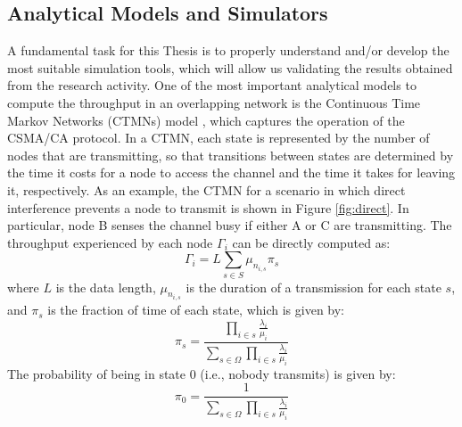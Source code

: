 \documentclass[12pt, a4paper,twoside]{tesi_upf}
\begin{document}
			\subsection{Analytical Models and Simulators}
			\label{section:validation}	
				A fundamental task for this Thesis is to properly understand and/or develop the most suitable simulation tools, which will allow us validating the results obtained from the research activity. One of the most important analytical models to compute the throughput in an overlapping network is the Continuous Time Markov Networks (CTMNs) model \cite{bellalta2014throughput}, which captures the operation of the CSMA/CA protocol. In a CTMN, each state is represented by the number of nodes that are transmitting, so that transitions between states are determined by the time it costs for a node to access the channel and the time it takes for leaving it, respectively. As an example, the CTMN for a scenario in which direct interference prevents a node to transmit is shown in Figure \ref{fig:direct}. In particular, node B senses the channel busy if either A or C are transmitting. The throughput experienced by each node $\Gamma_i$ can be directly computed as:
				\begin{equation}
					\Gamma_i = L \sum_{s \in S} \mu_{n_{i,s}}\pi_s
					\nonumber
				\end{equation}
				where $L$ is the data length, $\mu_{n_{i,s}}$ is the duration of a transmission for each state $s$, and $\pi_s$ is the fraction of time of each state, which is given by:
				\begin{equation}
					\pi_s = \frac{\prod_{i \in s}\frac{\lambda_i}{\mu_i}}{\sum_{s \in \Omega} \prod_{i \in s}\frac{\lambda_i}{\mu_i}}
					\nonumber
				\end{equation}
				The probability of being in state 0 (i.e., nobody transmits) is given by:
				\begin{equation}
					\pi_0 = \frac{1}{\sum_{s \in \Omega} \prod_{i \in s}\frac{\lambda_i}{\mu_i}}
					\nonumber
				\end{equation}
\end{document}
